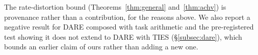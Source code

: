 The rate-distortion bound (Theorems~\ref{thm:general} and~\ref{thm:achv})
is provenance rather than a contribution, for the reasons above. We also
report a negative result for DARE composed with task arithmetic and the
pre-registered test showing it does not extend to DARE with TIES
(\S\ref{subsec:dare}), which bounds an earlier claim of ours rather than
adding a new one.
